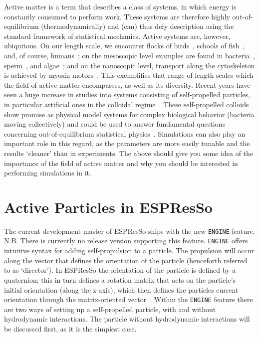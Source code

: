 \documentclass[aip,jcp,reprint,a4paper,onecolumn,amsmath]{revtex4-1}
\newcommand\code{\lstinline}
\newcommand{\es}{\mbox{\textsf{ESPResSo}}\xspace}
\begin{document}
Active matter is a term that describes a class of systems, in which energy is constantly consumed to perform work. These systems are therefore highly out-of-equilibrium (thermodynamically) and (can) thus defy description using the standard framework of statistical mechanics. Active systems are, however, ubiquitous. On our length scale, we encounter flocks of birds~\cite{Ballerini_08}, schools of fish~\cite{Katz_11}, and, of course, humans~\cite{Helbing_00,Zhang_13,Sliverberg_13}; on the mesoscopic level examples are found in bacteria~\cite{Sokolov_07,Schwarz-Linek_12,Reufer_14}, sperm~\cite{Woolley_03,Riedel_05,Ma_14}, and algae~\cite{Polin_09,Geyer_13}; and on the nanoscopic level, transport along the cytoskeleton is achieved by myosin motors~\cite{Mizuno07}. This exemplifies that range of length scales which the field of active matter encompasses, as well as its diversity. Recent years have seen a huge increase in studies into systems consisting of self-propelled particles, in particular artificial ones in the colloidal regime~\cite{ismagilov,Paxton_04,Wang_06,Brown,Ebbens,Ebbens_12,Howse_07,Valadares_10,simmchen,Yoshinaga,Baraban_13a,Buttinoni_12,Solovev_09,Mei_11}. These self-propelled colloids show promise as physical model systems for complex biological behavior (bacteria moving collectively) and could be used to answer fundamental questions concerning out-of-equilibrium statistical physics~\cite{Cates_12,Cates_14}. Simulations can also play an important role in this regard, as the parameters are more easily tunable and the results `cleaner' than in experiments. The above should give you some idea of the importance of the field of active matter and why you should be interested in performing simulations in it.

\section{\label{sec:swimming}Active Particles in ESPResSo}

The current development master of \es{} ships with the new \code{ENGINE} feature. N.B. There is currently no release version supporting this feature. \code{ENGINE} offers intuitive syntax for adding self-propulsion to a particle. The propulsion will occur along the vector that defines the orientation of the particle (henceforth referred to as `director'). In \es{} the orientation of the particle is defined by a quaternion; this in turn defines a rotation matrix that acts on the particle's initial orientation (along the z-axis), which then defines the particles current orientation through the matrix-oriented vector~\cite{UG,Limbach_06,Arnold_13}. Within the \code{ENGINE} feature there are two ways of setting up a self-propelled particle, with and without hydrodynamic interactions. The particle without hydrodynamic interactions will be discussed first, as it is the simplest case.
\end{document}
